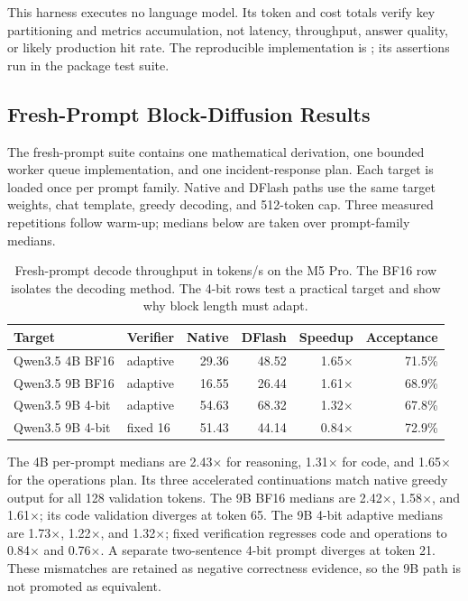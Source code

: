 \documentclass[11pt]{article}
\begin{document}
This harness executes no language model. Its token and cost totals verify key
partitioning and metrics accumulation, not latency, throughput, answer quality,
or likely production hit rate. The reproducible implementation is
; its assertions run in the package test
suite.

\subsection{Fresh-Prompt Block-Diffusion Results}
The fresh-prompt suite contains one mathematical derivation, one bounded worker
queue implementation, and one incident-response plan. Each target is loaded once
per prompt family. Native and DFlash paths use the same target weights, chat
template, greedy decoding, and 512-token cap. Three measured repetitions follow
warm-up; medians below are taken over prompt-family medians.

\begin{table}[H]
\centering
\small
\begin{tabular}{llrrrr}
\toprule
Target & Verifier & Native & DFlash & Speedup & Acceptance \\
\midrule
Qwen3.5 4B BF16 & adaptive & 29.36 & 48.52 & 1.65$\times$ & 71.5\% \\
Qwen3.5 9B BF16 & adaptive & 16.55 & 26.44 & 1.61$\times$ & 68.9\% \\
Qwen3.5 9B 4-bit & adaptive & 54.63 & 68.32 & 1.32$\times$ & 67.8\% \\
Qwen3.5 9B 4-bit & fixed 16 & 51.43 & 44.14 & 0.84$\times$ & 72.9\% \\
\bottomrule
\end{tabular}
\caption{Fresh-prompt decode throughput in tokens/s on the M5 Pro. The BF16
row isolates the decoding method. The 4-bit rows test a practical target and
show why block length must adapt.}
\label{tab:dflash}
\end{table}

The 4B per-prompt medians are 2.43$\times$ for reasoning, 1.31$\times$ for
code, and 1.65$\times$ for the operations plan. Its three accelerated
continuations match native greedy output for all 128 validation tokens. The 9B
BF16 medians are 2.42$\times$, 1.58$\times$, and 1.61$\times$; its code
validation diverges at token 65. The 9B 4-bit adaptive medians are
1.73$\times$, 1.22$\times$, and 1.32$\times$; fixed verification regresses
code and operations to 0.84$\times$ and 0.76$\times$. A separate two-sentence
4-bit prompt diverges at token 21. These mismatches are retained as negative
correctness evidence, so the 9B path is not promoted as equivalent.
\end{document}
